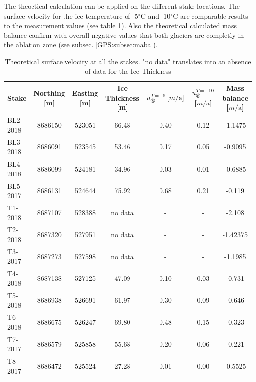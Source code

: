 The theoetical calculation can be applied on the different stake locations.
The surface velocity for the ice temperature of -5$^\circ$C and -10$^\circ$C are comparable results to the measurement values (see table \ref{GPS:tab:stakesvelocities}).
Also the theoretical calculated mass balance confirm with overall negative values that both glaciers are completly in the ablation zone (see subsec. \ref{GPS:subsec:maba}). 

\begin{table}[H]
    \centering
    \footnotesize
    \caption{Theoretical surface velocity at all the stakes. "no data" translates into an absence of data for the Ice Thickness}
	\begin{tabular}{lcccccc}
	\toprule
Stake & Northing [m] & Easting [m] & Ice Thickness [m] & $u_\circledS^{T=-5}\,[m / \text{a}]$ & $u_\circledS^{T=-10}$ [$m / \text{a}$] & Mass balance [$m / \text{a}$]\\
\midrule
BL2-2018 & 8686150 & 523051 & 66.48 & 0.40 & 0.12 & -1.1475\\
BL3-2018 & 8686091 & 523545 & 53.46 & 0.17 & 0.05 & -0.9095\\
BL4-2018 & 8686099 & 524181 & 34.96 & 0.03 & 0.01 & -0.6885\\
BL5-2017 & 8686131 & 524644 & 75.92 & 0.68 & 0.21 & -0.119\\
T1-2018 & 8687107 & 528388 & no data & - & - & -2.108\\
T2-2018 & 8687320 & 527951 & no data & - & - & -1.42375\\
T3-2017 & 8687273 & 527598 & no data & - & - & -1.1985\\
T4-2018 & 8687138 & 527125 & 47.09 & 0.10 & 0.03 & -0.731\\
T5-2018 & 8686938 & 526691 & 61.97 & 0.30 & 0.09 & -0.646\\
T6-2018 & 8686675 & 526247 & 69.80 & 0.48 & 0.15 & -0.323\\
T7-2017 & 8686579 & 525858 & 55.68 & 0.20 & 0.06 & -0.221\\
T8-2017 & 8686472 & 525524 & 27.28 & 0.01 & 0.00 & -0.5525\\
\bottomrule
	\end{tabular}
	\label{GPS:tab:stakesvelocities}
\end{table}
